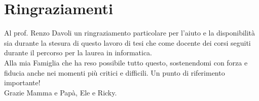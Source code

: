 

\chapter*{Ringraziamenti}
\thispagestyle{empty}
Al prof. Renzo Davoli un ringraziamento particolare per l'aiuto e la disponibilit\`a sia durante la stesura di questo lavoro di tesi che come docente dei corsi seguiti durante il percorso per la laurea in informatica.\\

Alla mia Famiglia che ha reso possibile tutto questo, sostenendomi con forza e fiducia anche nei momenti pi\`u critici e difficili. Un punto di riferimento importante!\\
Grazie Mamma e Pap\`a, Ele e Ricky.
